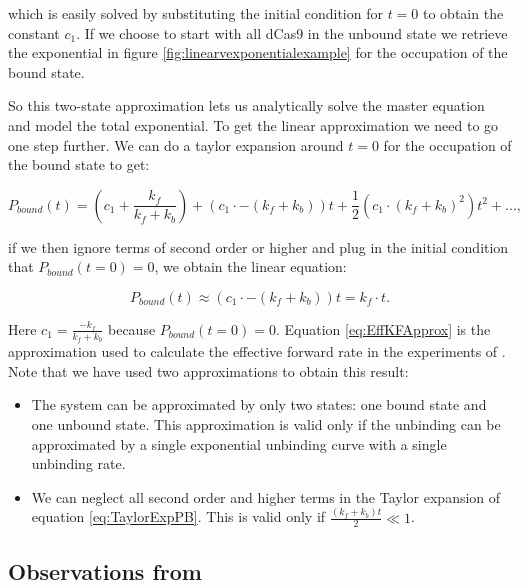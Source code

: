 which is easily solved by substituting the initial condition for $t=0$ to obtain the constant $c_1$. If we choose to start with all dCas9 in the unbound state we retrieve the exponential in figure \ref{fig:linearvexponentialexample} for the occupation of the bound state.

So this two-state approximation lets us analytically solve the master equation and model the total exponential. To get the linear approximation we need to go one step further. We can do a taylor expansion around $t=0$ for the occupation of the bound state to get:

\begin{equation}
P_{bound}(t) = (c_1 + \frac{k_f}{k_f+k_b}) + (c_1 \cdot -(k_f + k_b))t + \frac{1}{2}(c_1 \cdot (k_f + k_b)^2)t^2 + ...,
\label{eq:TaylorExpPB}
\end{equation}

if we then ignore terms of second order or higher and plug in the initial condition that $P_{bound}(t=0) = 0$, we obtain the linear equation:

\begin{equation}
P_{bound}(t) \approx (c_1 \cdot -(k_f + k_b))t = k_f \cdot t.
\label{eq:EffKFApprox}
\end{equation}

Here $c_1 = \frac{-k_f}{k_f+k_b}$ because $P_{bound}(t=0) = 0$. Equation \ref{eq:EffKFApprox} is the approximation used to calculate the effective forward rate in the experiments of \cite{PNAS}. Note that we have used two approximations to obtain this result:

\begin{itemize}
\item The system can be approximated by only two states: one bound state and one unbound state. This approximation is valid only if the unbinding can be approximated by a single exponential unbinding curve with a single unbinding rate.
\item We can neglect all second order and higher terms in the Taylor expansion of equation \ref{eq:TaylorExpPB}. This is valid only if $\frac{(k_f+k_b)t}{2} \ll 1$.
\end{itemize}


 


\subsection{Observations from \cite{PNAS}}

